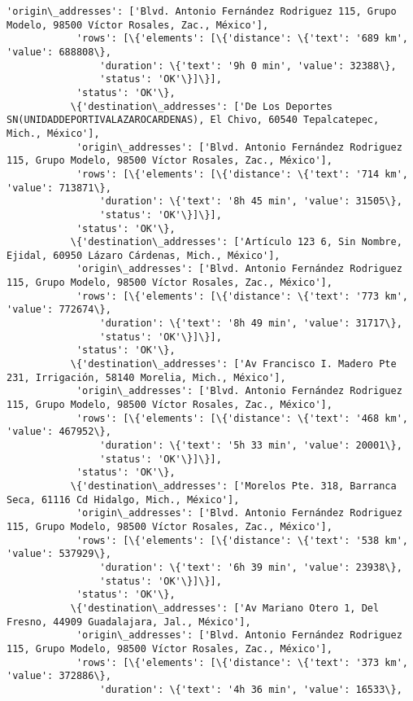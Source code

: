 \documentclass[11pt]{article}
\begin{document}
\begin{Verbatim}[commandchars=\\\{\}]
            'origin\_addresses': ['Blvd. Antonio Fernández Rodriguez 115, Grupo Modelo, 98500 Víctor Rosales, Zac., México'],
            'rows': [\{'elements': [\{'distance': \{'text': '689 km', 'value': 688808\},
                'duration': \{'text': '9h 0 min', 'value': 32388\},
                'status': 'OK'\}]\}],
            'status': 'OK'\},
           \{'destination\_addresses': ['De Los Deportes SN(UNIDADDEPORTIVALAZAROCARDENAS), El Chivo, 60540 Tepalcatepec, Mich., México'],
            'origin\_addresses': ['Blvd. Antonio Fernández Rodriguez 115, Grupo Modelo, 98500 Víctor Rosales, Zac., México'],
            'rows': [\{'elements': [\{'distance': \{'text': '714 km', 'value': 713871\},
                'duration': \{'text': '8h 45 min', 'value': 31505\},
                'status': 'OK'\}]\}],
            'status': 'OK'\},
           \{'destination\_addresses': ['Artículo 123 6, Sin Nombre, Ejidal, 60950 Lázaro Cárdenas, Mich., México'],
            'origin\_addresses': ['Blvd. Antonio Fernández Rodriguez 115, Grupo Modelo, 98500 Víctor Rosales, Zac., México'],
            'rows': [\{'elements': [\{'distance': \{'text': '773 km', 'value': 772674\},
                'duration': \{'text': '8h 49 min', 'value': 31717\},
                'status': 'OK'\}]\}],
            'status': 'OK'\},
           \{'destination\_addresses': ['Av Francisco I. Madero Pte 231, Irrigación, 58140 Morelia, Mich., México'],
            'origin\_addresses': ['Blvd. Antonio Fernández Rodriguez 115, Grupo Modelo, 98500 Víctor Rosales, Zac., México'],
            'rows': [\{'elements': [\{'distance': \{'text': '468 km', 'value': 467952\},
                'duration': \{'text': '5h 33 min', 'value': 20001\},
                'status': 'OK'\}]\}],
            'status': 'OK'\},
           \{'destination\_addresses': ['Morelos Pte. 318, Barranca Seca, 61116 Cd Hidalgo, Mich., México'],
            'origin\_addresses': ['Blvd. Antonio Fernández Rodriguez 115, Grupo Modelo, 98500 Víctor Rosales, Zac., México'],
            'rows': [\{'elements': [\{'distance': \{'text': '538 km', 'value': 537929\},
                'duration': \{'text': '6h 39 min', 'value': 23938\},
                'status': 'OK'\}]\}],
            'status': 'OK'\},
           \{'destination\_addresses': ['Av Mariano Otero 1, Del Fresno, 44909 Guadalajara, Jal., México'],
            'origin\_addresses': ['Blvd. Antonio Fernández Rodriguez 115, Grupo Modelo, 98500 Víctor Rosales, Zac., México'],
            'rows': [\{'elements': [\{'distance': \{'text': '373 km', 'value': 372886\},
                'duration': \{'text': '4h 36 min', 'value': 16533\},

\end{Verbatim}
\end{document}
